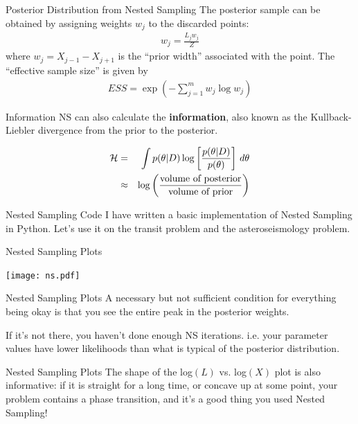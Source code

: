 \begin{frame}[t]{Posterior Distribution from Nested Sampling}
The posterior sample can be obtained by assigning weights $w_j$ to the
discarded points:
\begin{align*}
w_{j} = \frac{L_{j} w_{j}}{Z} 
\end{align*}
where $w_{j}=X_{j-1} - X_{j+1}$ is the ``prior width'' associated with the
point. The ``effective sample size'' is given by
\begin{align*}
ESS = \exp \left( - \sum_{j=1}^{m} w_j \log w_j \right)
\end{align*}

\end{frame}

\begin{frame}[t]{Information}
NS can also calculate the {\bf information}, also known as the Kullback-Liebler
divergence from the prior to the posterior.

\begin{eqnarray*}
\mathcal{H} &=& \int p(\theta | D) \log\left[\frac{p(\theta | D)}{p(\theta)}\right]
\, d\theta\\
&\approx& \log\left(
\frac{\textnormal{volume of posterior}}{\textnormal{volume of prior}}
\right)
\end{eqnarray*}
\end{frame}

\begin{frame}[t]{Nested Sampling Code}
I have written a basic implementation of Nested Sampling in Python. Let's
use it on the transit problem and the asteroseismology problem.

\end{frame}

\begin{frame}[t]{Nested Sampling Plots}
\vspace{-10pt}
\begin{center}
\texttt{[image: ns.pdf]}
\end{center}

\end{frame}

\begin{frame}[t]{Nested Sampling Plots}
A necessary but not sufficient condition for everything being okay is that you
see the entire peak in the posterior weights.\\

\vspace{20pt}

If it's not there, you haven't done enough NS iterations. i.e. your parameter
values have lower likelihoods than what is typical of the posterior distribution.
\end{frame}

\begin{frame}[t]{Nested Sampling Plots}
The shape of the log$(L)$ vs. log$(X)$ plot is also informative: if it is
straight for a long time, or concave up at some point, your problem contains
a phase transition, and it's a good thing you used Nested Sampling!
\end{frame}

